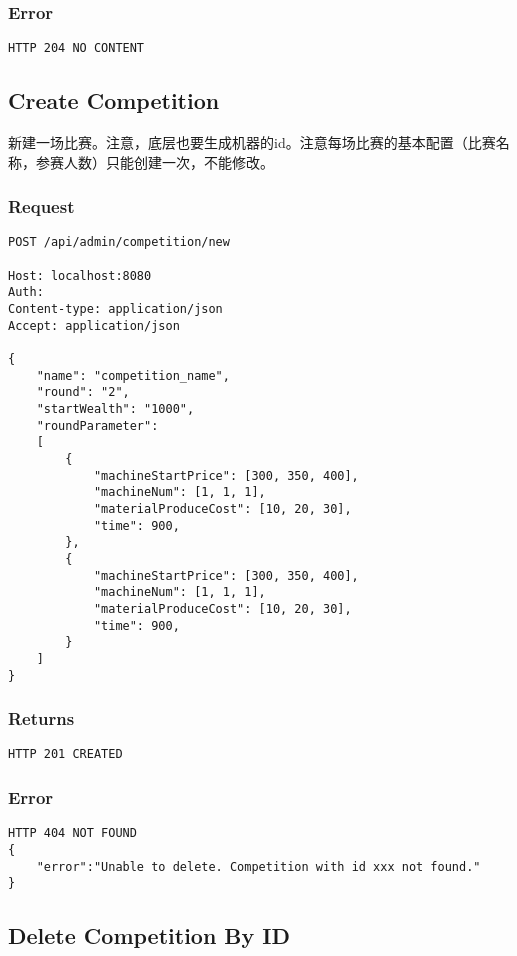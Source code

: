 \documentclass{article}
\begin{document}
\subsubsection*{Error}
\begin{lstlisting}
HTTP 204 NO CONTENT
\end{lstlisting}

\subsection{Create Competition}
新建一场比赛。注意，底层也要生成机器的id。注意每场比赛的基本配置（比赛名称，参赛人数）只能创建一次，不能修改。

\subsubsection*{Request}
\begin{lstlisting}
POST /api/admin/competition/new

Host: localhost:8080
Auth:
Content-type: application/json
Accept: application/json

{
    "name": "competition_name",
    "round": "2",
    "startWealth": "1000",
    "roundParameter":
    [
        {
            "machineStartPrice": [300, 350, 400],
            "machineNum": [1, 1, 1],
            "materialProduceCost": [10, 20, 30],
            "time": 900,
        },
        {
            "machineStartPrice": [300, 350, 400],
            "machineNum": [1, 1, 1],
            "materialProduceCost": [10, 20, 30],
            "time": 900,
        }
    ]
}
\end{lstlisting}

\subsubsection*{Returns}
\begin{lstlisting}
HTTP 201 CREATED

\end{lstlisting}

\subsubsection*{Error}
\begin{lstlisting}
HTTP 404 NOT FOUND
{
    "error":"Unable to delete. Competition with id xxx not found."
}
\end{lstlisting}


\subsection{Delete Competition By ID}
\end{document}
